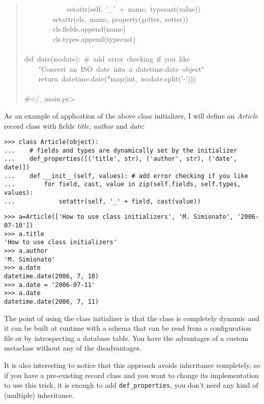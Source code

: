 \documentclass[10pt,a4paper,english]{article}
\begin{document}
\begin{quote}
{~~~~~~~~~~~~setattr(self,~'{\_}'~+~name,~typecast(value))~\\
~~~~~~~~setattr(cls,~name,~property(getter,~setter))~\\
~~~~~~~~cls.fields.append(name)~\\
~~~~~~~~cls.types.append(typecast)~\\
~\\
def~date(isodate):~{\#}~add~error~checking~if~you~like~\\
~~~~"Convert~an~ISO~date~into~a~datetime.date~object"~\\
~~~~return~datetime.date(*map(int,~isodate.split('-')))~\\
~\\
{\#}</{\_}main.py>
}\end{quote}

As an example of application of the above class initializer,
I will define an \emph{Article} record class with fields \emph{title}, \emph{author}
and \emph{date}:
\begin{verbatim}>>> class Article(object):
...    # fields and types are dynamically set by the initializer
...    def_properties([('title', str), ('author', str), ('date', date)])
...    def __init__(self, values): # add error checking if you like
...        for field, cast, value in zip(self.fields, self.types, values):
...            setattr(self, '_' + field, cast(value))\end{verbatim}
\begin{verbatim}>>> a=Article(['How to use class initializers', 'M. Simionato', '2006-07-10'])
>>> a.title
'How to use class initializers'
>>> a.author
'M. Simionato'
>>> a.date
datetime.date(2006, 7, 10)
>>> a.date = '2006-07-11'
>>> a.date
datetime.date(2006, 7, 11)\end{verbatim}

The point of using the class initializer is that the class is completely
dynamic and it can be built at runtime with a schema that can be read
from a configuration file or by introspecting a database table. You
have the advantages of a custom metaclass without any of the disadvantages.

It is also interesting to notice that this approach avoids inheritance
completely, so if you have a pre-existing record class and you want
to change its implementation to use this trick, it is enough to add
\texttt{def{\_}properties}, you don't need any kind of (multiple)
inheritance.


\end{document}
